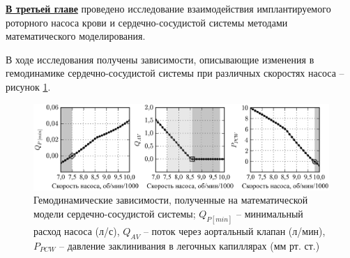 
\underline{\textbf{В третьей главе}} проведено исследование взаимодействия имплантируемого роторного насоса крови и сердечно-сосудистой системы методами математического моделирования. 




В ходе исследования получены зависимости, описывающие изменения в гемодинамике сердечно-сосудистой системы при различных скоростях насоса -- рисунок \ref{img:pumping_states_general}. 

\begin{figure}[!ht] 
  \center
  \noindent\includegraphics [scale=1.0] {../images/pumping_states_abs}
  \caption{Гемодинамические зависимости, полученные на математической модели сердечно-сосудистой системы; $Q_{P[min]}$ -- минимальный расход насоса (л/с), $Q_{AV}$ -- поток через аортальный клапан (л/мин), $P_{PCW}$ -- давление заклинивания в легочных капиллярах (мм рт. ст.)} 
  \label{img:pumping_states_general}  
\end{figure}

